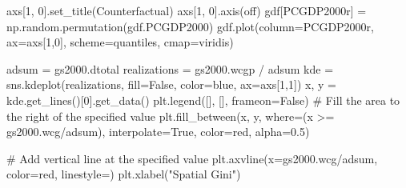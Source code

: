 \documentclass[
  a4paper, 
  twoside,
  final
]{article}
\newenvironment{Shaded}{\begin{snugshade}}{\end{snugshade}}
\newcommand{\CommentTok}[1]{\textcolor[rgb]{0.37,0.37,0.37}{#1}}
\newcommand{\DecValTok}[1]{\textcolor[rgb]{0.68,0.00,0.00}{#1}}
\newcommand{\FloatTok}[1]{\textcolor[rgb]{0.68,0.00,0.00}{#1}}
\newcommand{\NormalTok}[1]{\textcolor[rgb]{0.00,0.23,0.31}{#1}}
\newcommand{\OperatorTok}[1]{\textcolor[rgb]{0.37,0.37,0.37}{#1}}
\newcommand{\StringTok}[1]{\textcolor[rgb]{0.13,0.47,0.30}{#1}}
\newcommand{\VariableTok}[1]{\textcolor[rgb]{0.07,0.07,0.07}{#1}}
\begin{document}
\begin{Shaded}
\begin{Highlighting}[]
\NormalTok{axs[}\DecValTok{1}\NormalTok{, }\DecValTok{0}\NormalTok{].set\_title(}\StringTok{\textquotesingle{}Counterfactual\textquotesingle{}}\NormalTok{)}
\NormalTok{axs[}\DecValTok{1}\NormalTok{, }\DecValTok{0}\NormalTok{].axis(}\StringTok{\textquotesingle{}off\textquotesingle{}}\NormalTok{)}
\NormalTok{gdf[}\StringTok{\textquotesingle{}PCGDP2000r\textquotesingle{}}\NormalTok{] }\OperatorTok{=}\NormalTok{ np.random.permutation(gdf.PCGDP2000)}
\NormalTok{gdf.plot(column}\OperatorTok{=}\StringTok{\textquotesingle{}PCGDP2000r\textquotesingle{}}\NormalTok{, ax}\OperatorTok{=}\NormalTok{axs[}\DecValTok{1}\NormalTok{,}\DecValTok{0}\NormalTok{], scheme}\OperatorTok{=}\StringTok{\textquotesingle{}quantiles\textquotesingle{}}\NormalTok{,}
\NormalTok{         cmap}\OperatorTok{=}\StringTok{\textquotesingle{}viridis\textquotesingle{}}\NormalTok{)}

\NormalTok{adsum }\OperatorTok{=}\NormalTok{ gs2000.dtotal}
\NormalTok{realizations }\OperatorTok{=}\NormalTok{ gs2000.wcgp }\OperatorTok{/}\NormalTok{ adsum}
\NormalTok{kde }\OperatorTok{=}\NormalTok{ sns.kdeplot(realizations, fill}\OperatorTok{=}\VariableTok{False}\NormalTok{, color}\OperatorTok{=}\StringTok{\textquotesingle{}blue\textquotesingle{}}\NormalTok{, ax}\OperatorTok{=}\NormalTok{axs[}\DecValTok{1}\NormalTok{,}\DecValTok{1}\NormalTok{])}
\NormalTok{x, y }\OperatorTok{=}\NormalTok{ kde.get\_lines()[}\DecValTok{0}\NormalTok{].get\_data()}
\NormalTok{plt.legend([], [], frameon}\OperatorTok{=}\VariableTok{False}\NormalTok{)}
\CommentTok{\# Fill the area to the right of the specified value}
\NormalTok{plt.fill\_between(x, y, where}\OperatorTok{=}\NormalTok{(x }\OperatorTok{\textgreater{}=}\NormalTok{ gs2000.wcg}\OperatorTok{/}\NormalTok{adsum),}
\NormalTok{                 interpolate}\OperatorTok{=}\VariableTok{True}\NormalTok{, color}\OperatorTok{=}\StringTok{\textquotesingle{}red\textquotesingle{}}\NormalTok{, alpha}\OperatorTok{=}\FloatTok{0.5}\NormalTok{)}

\CommentTok{\# Add vertical line at the specified value}
\NormalTok{plt.axvline(x}\OperatorTok{=}\NormalTok{gs2000.wcg}\OperatorTok{/}\NormalTok{adsum, color}\OperatorTok{=}\StringTok{\textquotesingle{}red\textquotesingle{}}\NormalTok{, linestyle}\OperatorTok{=}\StringTok{\textquotesingle{}{-}{-}\textquotesingle{}}\NormalTok{)}
\NormalTok{plt.xlabel(}\StringTok{"Spatial Gini"}\NormalTok{)}



\end{Highlighting}
\end{Shaded}
\end{document}
